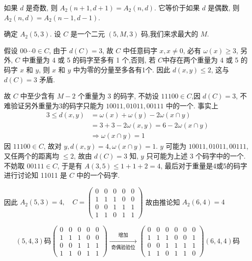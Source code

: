 \begin{corollary}
    如果 $ d $ 是奇数, 则 $ A_{2}(n+1, d+1)=A_{2}(n, d) $. 它等价于如果 $ d $ 是偶数, 则 $ A_{2}(n, d)=A_{2}(n-1, d-1) $.
\end{corollary}
\begin{example}
    确定 $ A_{2}(5,3) $. 设 $ C $ 是一个二元 $ (5, M, 3) $ 码,我们来求最大的 $ M $.

假设 $ 00 \cdots 0 \in C $, 由于 $ d(C)=3 $, 故 $ C $ 中任意码字 $ x, x \neq 0 $, 必有 $ \omega(x) \geq 3 $, 另外, $ C $ 中重量为 4 或 5 的码字至多有 1 个,否则, 若 $ C $中存在两个重量为 4 或 5 的码字 $ x $ 和 $ y $, 则 $ x $ 和 $ y $ 中为零的分量至多各有1个. 因此 $ d(x, y) \leq 2 $, 这与 $ d(C)=3 $ 矛盾.

故 $ C $ 中至少含有 $ M-2 $ 个重量为 3 的码字, 不妨设 $ 11100 \in C $,因 $ d(C)=3 $, 不难验证另外重量为3的码字只能为 $ 10011,01011,00111 $ 中的一个. 事实上
$$
\begin{aligned}
3 \leq d(x, y)&=\omega(x)+  \omega(y)-2 \omega(x \cap y) \\
& =3+3-2 \omega(x, y)=6-2 \omega(x \cap y) \\
& \Rightarrow \omega(x \cap y)=1
\end{aligned}
$$
因 $ 11100 \in C $, 故对 $ y, d(x, y)=4, \omega(x \cap y)=1 $. 
$ y $ 可能为 $ 10011,01011,00111 $, 又任两个的距离均 $ \leq 2 $, 故由 $ d(C)=3 $ 知, $ y $ 只可能为上述 3 个码字中的一个. 不妨取 $ 00111 \in C $, 于是有 $ A(3,5) \leq 1+1+2=4 $, 最后对于重量是4或5的码字进行讨论知 11011 是 $ C $ 中的一个码字.

因此 $ A_{2}(5,3)=4, \quad C=\left(\begin{array}{lllll}0 & 0 & 0 & 0 & 0 \\ 1 & 1 & 1 & 0 & 0 \\ 0 & 0 & 1 & 1 & 1 \\ 1 & 1 & 0 & 1 & 1\end{array}\right) $
故由推论知 $ A_{2}(6,4)=4 $

$$ (5,4,3)\text{码}\left(\begin{array}{lllll}0 & 0 & 0 & 0 & 0 \\ 1 & 1 & 1 & 0 & 0 \\ 0 & 0 & 1 & 1 & 1 \\ 1 & 1 & 0 & 1 & 1\end{array}\right) \underset{\text { 奇偶验验位 }}{\stackrel{\text { 增加 }}{\longrightarrow}}\left(\begin{array}{llllll}0 & 0 & 0 & 0 & 0 & 0 \\ 1 & 1 & 1 & 0 & 0 & 1 \\ 0 & 0 & 1 & 1 & 1 & 1 \\ 1 & 1 & 0 & 1 & 1 & 0\end{array}\right)(6,4,4)\text{码} $$
\end{example}
